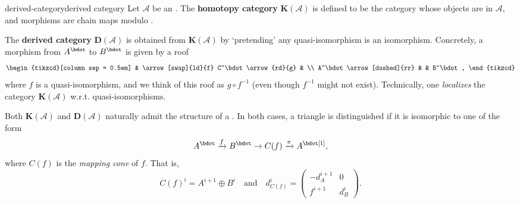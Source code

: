 \begin{topic}{derived-category}{derived category}
    Let $\mathcal{A}$ be an . The \textbf{homotopy category} $\textbf{K}(\mathcal{A})$ is defined to be the category whose objects are  in $\mathcal{A}$, and morphisms are chain maps modulo .
    
    The \textbf{derived category} $\textbf{D}(\mathcal{A})$ is obtained from $\textbf{K}(\mathcal{A})$ by `pretending' any quasi-isomorphism is an isomorphism. Concretely, a morphism from $A^\bdot$ to $B^\bdot$ is given by a roof
    \[ \begin{tikzcd}[column sep = 0.5em] & \arrow[swap]{ld}{f} C^\bdot \arrow{rd}{g} & \\ A^\bdot \arrow[dashed]{rr} & & B^\bdot , \end{tikzcd} \]
    where $f$ is a quasi-isomorphism, and we think of this roof as $g \circ f^{-1}$ (even though $f^{-1}$ might not exist). Technically, one \textit{localizes} the category $\textbf{K}(\mathcal{A})$ w.r.t. quasi-isomorphisms.
    
    Both $\textbf{K}(\mathcal{A})$ and $\textbf{D}(\mathcal{A})$ naturally admit the structure of a . In both cases, a triangle is distinguished if it is isomorphic to one of the form
    \[ A^\bdot \xrightarrow{f} B^\bdot \to C(f) \xrightarrow{\pi} A^\bdot[1] , \]
    where $C(f)$ is the \textit{mapping cone} of $f$. That is,
    \[ C(f)^i = A^{i + 1} \oplus B^i \quad \text{and} \quad d_{C(f)}^i = \begin{pmatrix} -d_A^{i + 1} & 0 \\ f^{i + 1} & d_B^i \end{pmatrix} . \]
\end{topic}
